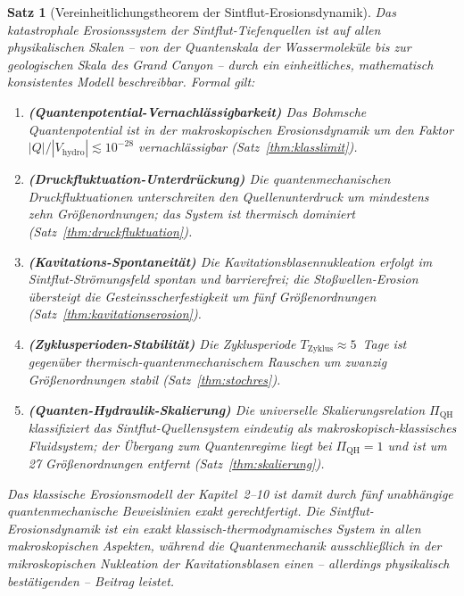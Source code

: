 ﻿\documentclass[12pt,a4paper]{report}
\newtheorem{theorem}{Satz}[chapter]
\begin{document}
\begin{theorem}[Vereinheitlichungstheorem der Sintflut-Erosionsdynamik]
	\label{thm:vereinheitlichung}
	Das katastrophale Erosionssystem der Sintflut-Tiefenquellen ist auf allen physikalischen Skalen -- von der Quantenskala der Wassermoleküle bis zur geologischen Skala des Grand Canyon -- durch ein einheitliches, mathematisch konsistentes Modell beschreibbar. Formal gilt:
	
	\begin{enumerate}
		\item \textbf{(Quantenpotential-Vernachlässigbarkeit)} Das Bohmsche Quantenpotential ist in der makroskopischen Erosionsdynamik um den Faktor $|Q|/|V_\mathrm{hydro}| \lesssim 10^{-28}$ vernachlässigbar (Satz~\ref{thm:klasslimit}).
		
		\item \textbf{(Druckfluktuation-Unterdrückung)} Die quantenmechanischen Druckfluktuationen unterschreiten den Quellenunterdruck um mindestens zehn Größenordnungen; das System ist thermisch dominiert (Satz~\ref{thm:druckfluktuation}).
		
		\item \textbf{(Kavitations-Spontaneität)} Die Kavitationsblasennukleation erfolgt im Sintflut-Strömungsfeld spontan und barrierefrei; die Stoßwellen-Erosion übersteigt die Gesteinsscherfestigkeit um fünf Größenordnungen (Satz~\ref{thm:kavitationserosion}).
		
		\item \textbf{(Zyklusperioden-Stabilität)} Die Zyklusperiode $T_\mathrm{Zyklus} \approx 5$~Tage ist gegenüber thermisch-quantenmechanischem Rauschen um zwanzig Größenordnungen stabil (Satz~\ref{thm:stochres}).
		
		\item \textbf{(Quanten-Hydraulik-Skalierung)} Die universelle Skalierungsrelation $\Pi_\mathrm{QH}$ klassifiziert das Sintflut-Quellensystem eindeutig als makroskopisch-klassisches Fluidsystem; der Übergang zum Quantenregime liegt bei $\Pi_\mathrm{QH} = 1$ und ist um 27 Größenord\-nungen entfernt (Satz~\ref{thm:skalierung}).
	\end{enumerate}
	
	Das klassische Erosionsmodell der Kapitel~2--10 ist damit durch fünf unabhängige quantenmechanische Beweislinien exakt gerechtfertigt. Die Sintflut-Erosionsdynamik ist ein exakt klassisch-thermodynamisches System in allen makroskopischen Aspekten, während die Quantenmechanik ausschließlich in der mikroskopischen Nukleation der Kavitationsblasen einen -- allerdings physikalisch bestätigenden -- Beitrag leistet.
\end{theorem}
\end{document}

